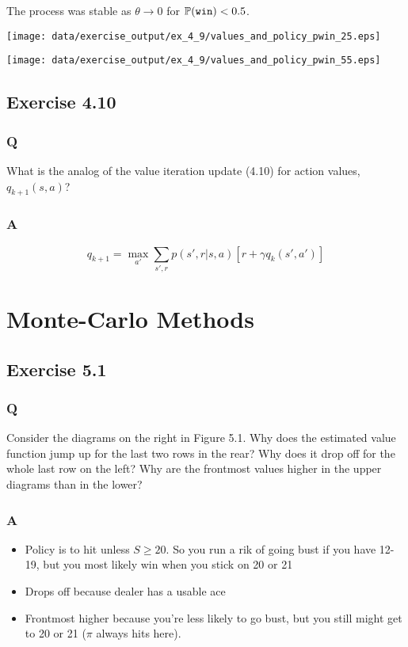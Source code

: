 The process was stable as $\theta \to 0$ for $\P{}(\mathtt{win}) < 0.5$.

\texttt{[image: data/exercise\_output/ex\_4\_9/values\_and\_policy\_pwin\_25.eps]}

\texttt{[image: data/exercise\_output/ex\_4\_9/values\_and\_policy\_pwin\_55.eps]}

\subsection{Exercise 4.10}
\subsubsection{Q}
What is the analog of the value iteration update (4.10) for action values, $q_{k+1}(s, a)$?

\subsubsection{A}
\begin{equation}
    q_{k+1} = \max_{a'} \sum_{s', r} p(s', r| s, a)\left[r + \gamma q_k(s', a')\right]
\end{equation}


\clearpage
\section{Monte-Carlo Methods}
\subsection{Exercise 5.1}
\subsubsection{Q}
Consider the diagrams on the right in Figure 5.1. Why does the estimated value function jump up for the last two rows in the rear? Why does it drop off for the whole last row on the left? Why are the frontmost values higher in the upper diagrams than in the lower?

\subsubsection{A}
\begin{itemize}
    \item Policy is to hit unless $S \geq 20$. So you run a rik of going bust if you have 12-19, but you most likely win when you stick on 20 or 21
    \item Drops off because dealer has a usable ace
    \item Frontmost higher because you're less likely to go bust, but you still might get to 20 or 21 ($\pi$ always hits here).
\end{itemize}

